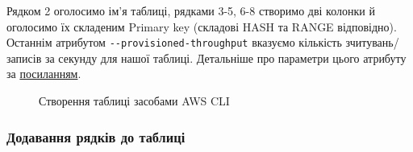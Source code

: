 \documentclass[a4paper,14pt]{extarticle} %
\begin{document}
Рядком 2 оголосимо ім'я таблиці, рядками 3-5, 6-8 створимо дві колонки й оголосимо їх складеним Primary key 
(складові HASH та RANGE відповідно). Останнім атрибутом \texttt{{-}{-}provisioned-throughput} вказуємо кількість 
зчитувань/записів за секунду для нашої таблиці. Детальніше про параметри цього атрибуту за 
\href{https://docs.aws.amazon.com/amazondynamodb/latest/developerguide/ProvisionedThroughput.html#ProvisionedThroughput.CapacityUnits.Read}{посиланням}.

\begin{figure}[H]
    \begin{minipage}[H]{1\linewidth}
    \end{minipage}
    \vfill
    \begin{minipage}[H]{1\linewidth}
        \caption{Створення таблиці засобами AWS CLI}
        \label{fig:create table AWS CLI}
    \end{minipage}
\end{figure}

\subsubsection*{Додавання рядків до таблиці}
\end{document}
